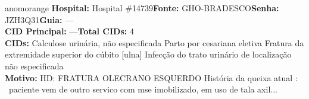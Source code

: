 \documentclass[a4paper,10pt]{article}
\begin{document}
\begin{anomalycard}[Interna\c{c}\~{a}o \#117958 | Pac. \#97890 | ALTO (z=4.28) | LOS: 2d | 21/02/2026\,$\to$\,23/02/2026]{anomorange}
\textbf{Hospital:} Hospital \#14739\quad \textbf{Fonte:} GHO-BRADESCO\quad \textbf{Senha:} JZH3Q31\quad \textbf{Guia:} ---\\

\textbf{CID Principal:} {\small ---}\quad\textbf{Total CIDs:} 4\\

\textbf{CIDs:} {\scriptsize Calculose urinária, não especificada \textbar{} Parto por cesariana eletiva \textbar{} Fratura da extremidade superior do cúbito [ulna] \textbar{} Infecção do trato urinário de localização não especificada}\\

\textbf{Motivo:} {\scriptsize HD: FRATURA OLECRANO ESQUERDO  História da queixa atual :  paciente vem de outro servico com mse imobilizado, em uso de tala axil...}\\




\end{anomalycard}
\end{document}
